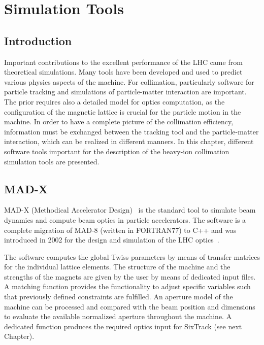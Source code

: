 \chapter{Simulation Tools}\label{chap:simulation_tools}
\section*{Introduction}
Important contributions to the excellent performance of the LHC came from theoretical simulations. Many tools have been developed and used to predict various physics aspects of the machine. For collimation, particularly software for particle tracking and simulations of particle-matter interaction are important. The prior requires also a detailed model for optics computation, as the configuration of the magnetic lattice is crucial for the particle motion in the machine. In order to have a complete picture of the collimation efficiency, information must be exchanged between the tracking tool and the particle-matter interaction, which can be realized in different manners. In this chapter, different software tools important for the description of the heavy-ion collimation simulation tools are presented.




\section{MAD-X}
MAD-X (Methodical Accelerator Design)~\cite{MADXref01} is the standard tool to simulate beam dynamics and compute beam optics in particle accelerators. The software is a complete migration of MAD-8 (written in FORTRAN77) to C++ and was introduced in 2002 for the design and simulation of the LHC optics~\cite{MADXref02}.

The software computes the global Twiss parameters by means of transfer matrices for the individual lattice elements. The structure of the machine and the strengths of the magnets are given by the user by means of dedicated input files. A matching function provides the functionality to adjust specific variables such that previously defined constraints are fulfilled. An aperture model of the machine can be processed and compared with the beam position and dimensions to evaluate the available normalized aperture throughout the machine. A dedicated function produces the required optics input for SixTrack (see next Chapter). 




